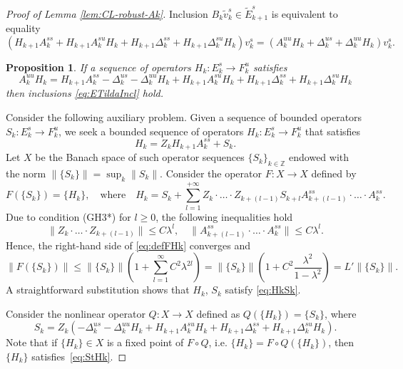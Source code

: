 \documentclass[12pt]{article}
\newcommand{\Zz}{\mathbb{Z}}
\newtheorem{statement}[thm]{Proposition}
\theoremstyle{definition}
\begin{document}
\begin{proof}[Proof of Lemma \ref{lem:CL-robust-Ak}]
Inclusion $B_k \tilde{v}_k^s \in \tilde{E}_{k+1}^s$ is equivalent to equality 
$$
(H_{k+1}A_k^{ss} + H_{k+1}A_k^{su}H_k + H_{k+1}\Delta_k^{ss} + H_{k+1}\Delta_k^{su}H_k)v_k^s = 
(A_k^{uu}H_k + \Delta_k^{us} + \Delta_k^{uu}H_k)v_k^s.
$$
\begin{statement}
    If a sequence of operators $H_k: E_k^s \to F_k^u$ satisfies
\begin{equation}\label{eq:StHk}
        A_k^{uu}H_k = H_{k+1}A_k^{ss} - \Delta_k^{us} - \Delta_k^{uu}H_k + H_{k+1}A_k^{su}H_k + H_{k+1}\Delta_k^{ss} + H_{k+1}\Delta_k^{su}H_k
\end{equation}
    then inclusions \eqref{eq:ETildaIncl} hold.
\end{statement}
Consider the following auxiliary problem. Given a sequence of bounded operators $S_k: E_k^s \to F_k^u$, we seek a bounded sequence of operators $H_k: E_k^s \to F_k^u$ that satisfies
\begin{equation}\label{eq:HkSk}
H_k = Z_kH_{k+1}A_k^{ss} + S_k.
\end{equation}
Let $X$ be the Banach space of such operator sequences $\{S_k\}_{k \in \Zz}$ endowed with the norm
$\|\{S_k\}\| = \sup_k \|S_k\|$. Consider the operator $F:X\to X$ defined by
\begin{equation}\label{eq:defFHk}
F(\{S_k\}) = \{H_k\}, \quad \mbox{where} \quad H_k = S_k + \sum_{l = 1}^{+\infty}Z_k\cdot \ldots \cdot Z_{k+(l-1)}S_{k+l}A_{k+(l-1)}^{ss} \cdot \ldots \cdot A_k^{ss}.    
\end{equation}
Due to condition (GH3*) for $l \geq 0$, the following inequalities hold
$$
    \|Z_k\cdot \ldots \cdot Z_{k+(l-1)}\|   \leq C \lambda^l, \quad
    \|A_{k+(l-1)}^{ss}\cdot \ldots \cdot A_k^{ss}\|   \leq C \lambda^l.
$$
Hence, the right-hand side of \eqref{eq:defFHk} converges and
\begin{equation}\label{eq:FL'}
\|F(\{S_k\})\| \leq \|\{S_k\}\| \left(1+ \sum_{l=1}^{\infty} C^2\lambda^{2l} \right) = \|\{S_k\}\|\left(1+ C^2 \frac{\lambda^2}{1-\lambda^2}\right) = L' \|\{S_k\}\|.    
\end{equation}
A straightforward substitution shows that $H_k$, $S_k$ satisfy \eqref{eq:HkSk}.

Consider the nonlinear operator
$Q:X \to X$ defined as
$Q(\{H_k\}) = \{S_k\}$, where
$$
S_k = Z_k(- \Delta_k^{us} - \Delta_k^{uu}H_k + H_{k+1}A_k^{su}H_k + H_{k+1}\Delta_k^{ss} + H_{k+1}\Delta_k^{su}H_k).
$$
Note that if $\{H_k\} \in X$ is a fixed point of $F \circ Q$, i.e. $\{H_k\} = F \circ Q (\{H_k\})$, then $\{H_k\}$ satisfies~\eqref{eq:StHk}.


\end{proof}
\end{document}
